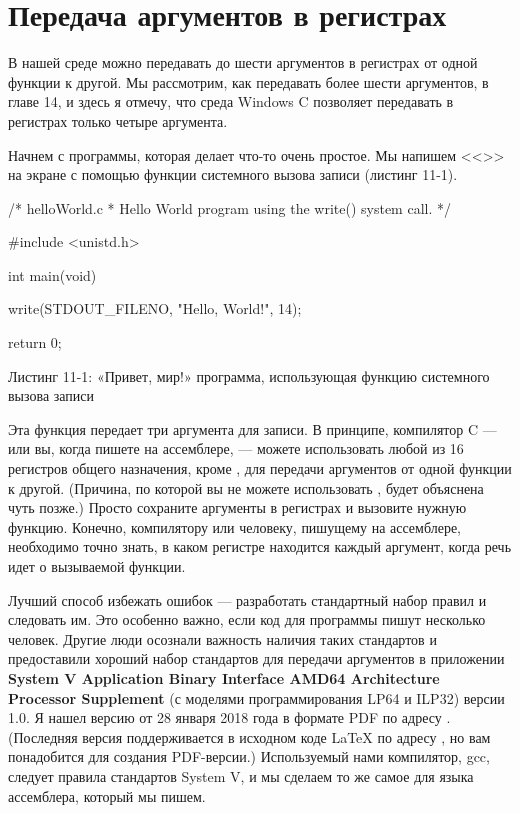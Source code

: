 \section{Передача аргументов в регистрах}

В нашей среде можно передавать до шести аргументов в регистрах от одной функции к другой. Мы рассмотрим, как передавать более шести аргументов, в главе 14, и здесь я отмечу, что среда Windows C позволяет передавать в регистрах только четыре аргумента.

Начнем с программы, которая делает что-то очень простое. Мы напишем <<>> на экране с помощью функции системного вызова записи (листинг 11-1).

\begin{ffcode}
/* helloWorld.c
 * Hello World program using the write() system call.
 */

#include <unistd.h>

int main(void)
{

  write(STDOUT_FILENO, "Hello, World!\n", 14);

  return 0;
}
\end{ffcode}

\begin{center}
Листинг 11-1: «Привет, мир!» программа, использующая функцию системного вызова записи
\end{center}

Эта функция передает три аргумента для записи. В принципе, компилятор C — или вы, когда пишете на ассемблере, — можете использовать любой из 16 регистров общего назначения, кроме , для передачи аргументов от одной функции к другой. (Причина, по которой вы не можете использовать , будет объяснена чуть позже.) Просто сохраните аргументы в регистрах и вызовите нужную функцию. Конечно, компилятору или человеку, пишущему на ассемблере, необходимо точно знать, в каком регистре находится каждый аргумент, когда речь идет о вызываемой функции.

Лучший способ избежать ошибок — разработать стандартный набор правил и следовать им. Это особенно важно, если код для программы пишут несколько человек. Другие люди осознали важность наличия таких стандартов и предоставили хороший набор стандартов для передачи аргументов в приложении \textbf{System V Application Binary Interface AMD64 Architecture Processor Supplement} (с моделями программирования LP64 и ILP32) версии 1.0. Я нашел версию от 28 января 2018 года в формате PDF по адресу . (Последняя версия поддерживается в исходном коде LaTeX по адресу , но вам понадобится  для создания PDF-версии.) Используемый нами компилятор, gcc, следует правила стандартов System V, и мы сделаем то же самое для языка ассемблера, который мы пишем.

